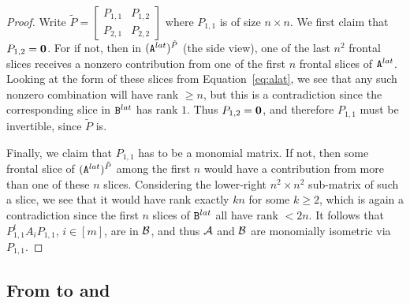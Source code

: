 \documentclass[11pt]{article}
\begin{document}
\begin{proof}
Write $\tilde P = \begin{bmatrix}
P_{1,1} & P_{1,2} \\
P_{2,1} & P_{2,2}
\end{bmatrix}$ where $P_{1,1}$ is of size $n\times n$. We first claim that 
$P_{1,2}=\mathbf{0}$. For if not, then in $(\mathtt{A}^{lat})^{\tilde P}$ (the side view), 
one of the last $n^2$ frontal slices receives a nonzero contribution from one of 
the first $n$ frontal slices of $\mathtt{A}^{lat}$. Looking at the form of these slices 
from Equation~\ref{eq:alat}, we see that any such nonzero combination will have 
rank $\geq n$, but this is a contradiction since the corresponding slice in 
$\mathtt{B}^{lat}$ has rank $1$. Thus $P_{1,2}=\mathbf{0}$, and therefore $P_{1,1}$ must be 
invertible, since $\tilde P$ is.

Finally, we claim that $P_{1,1}$ has to be a monomial matrix. If not, then some frontal slice of $(\mathtt{A}^{lat})^{\tilde P}$ among the first $n$ would have a contribution from more than one of these $n$ slices. Considering the lower-right $n^2 \times n^2$ sub-matrix of such a slice, we see that it would have rank exactly $kn$ for some $k \geq 2$, which is again a contradiction since the first $n$ slices of $\mathtt{B}^{lat}$ all have rank $< 2n$. It follows 
that 
$P_{1,1}^t A_i P_{1,1}$, $i\in[m]$, are in $\mathcal{B}$, and thus
$\mathcal{A}$ and $\mathcal{B}$ are monomially isometric via $P_{1,1}$. 
\end{proof}

\subsection{From \ThreeTIlong to \MatSpIsomlong and }\label{sec:3tensor_alternating}
\end{document}
